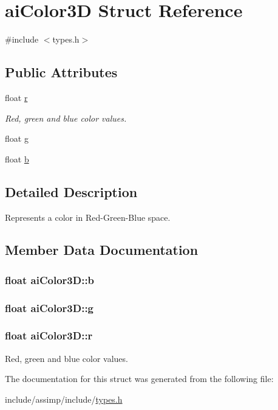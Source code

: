 \hypertarget{structai_color3_d}{\section{ai\-Color3\-D Struct Reference}
\label{structai_color3_d}
}


{\ttfamily \#include $<$types.\-h$>$}

\subsection*{Public Attributes}
\begin{DoxyCompactItemize}
\item 
float \hyperlink{structai_color3_d_a0ff704458aa26c84bbfe93b2dd89c630}{r}
\begin{DoxyCompactList}\small\item\em Red, green and blue color values. \end{DoxyCompactList}\item 
float \hyperlink{structai_color3_d_a40ecdcee92b5373cbaa5e00ebcdb2cfb}{g}
\item 
float \hyperlink{structai_color3_d_a02ddcc7af11f7d4d6ea14f1bfb4ef6c7}{b}
\end{DoxyCompactItemize}


\subsection{Detailed Description}
Represents a color in Red-\/\-Green-\/\-Blue space. 

\subsection{Member Data Documentation}
\hypertarget{structai_color3_d_a02ddcc7af11f7d4d6ea14f1bfb4ef6c7}{
\subsubsection[{b}]{\setlength{\rightskip}{0pt plus 5cm}float ai\-Color3\-D\-::b}}\label{structai_color3_d_a02ddcc7af11f7d4d6ea14f1bfb4ef6c7}
\hypertarget{structai_color3_d_a40ecdcee92b5373cbaa5e00ebcdb2cfb}{
\subsubsection[{g}]{\setlength{\rightskip}{0pt plus 5cm}float ai\-Color3\-D\-::g}}\label{structai_color3_d_a40ecdcee92b5373cbaa5e00ebcdb2cfb}
\hypertarget{structai_color3_d_a0ff704458aa26c84bbfe93b2dd89c630}{
\subsubsection[{r}]{\setlength{\rightskip}{0pt plus 5cm}float ai\-Color3\-D\-::r}}\label{structai_color3_d_a0ff704458aa26c84bbfe93b2dd89c630}


Red, green and blue color values. 



The documentation for this struct was generated from the following file\-:\begin{DoxyCompactItemize}
\item 
include/assimp/include/\hyperlink{types_8h}{types.\-h}\end{DoxyCompactItemize}
